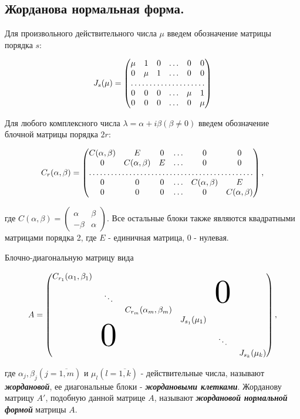 \subsection{
    Жорданова нормальная форма.
}

Для произвольного действительного числа $\mu$ введем обозначение матрицы порядка $s$:

$$J_s(\mu) = \begin{pmatrix} 
    \mu & 1 & 0 & \ldots & 0 & 0 \\
    0 & \mu & 1 & \ldots & 0 & 0 \\
    \hdotsfor6 \\
    0 & 0 & 0 & \ldots & \mu & 1 \\
    0 & 0 & 0 & \ldots & 0 & \mu
\end{pmatrix}$$

Для любого комплексного числа $\lambda = \alpha + i\beta (\beta \ne 0)$ введем обозначение блочной матрицы порядка $2r$:

$$C_r(\alpha, \beta) = \begin{pmatrix} 
    C(\alpha, \beta) & E & 0 & \ldots & 0 & 0 \\
    0 & C(\alpha, \beta) & E & \ldots & 0 & 0 \\
    \hdotsfor6 \\
    0 & 0 & 0 & \ldots & C(\alpha, \beta) & E \\
    0 & 0 & 0 & \ldots & 0 & C(\alpha, \beta)
\end{pmatrix},$$

где $C(\alpha, \beta) = \begin{pmatrix} 
    \alpha & \beta \\
    -\beta & \alpha
\end{pmatrix}$. Все остальные блоки также являются квадратными матрицами порядка 2, где $E$ - единичная матрица, 0 - нулевая.

Блочно-диагональную матрицу вида

\[
A = \begin{pmatrix}
    C_{r_1}(\alpha_1, \beta_1) &        &        &        &  \\
                               & \ddots &        &        & \scaleobj{4}{0}   \\
                               &        & C_{r_m}(\alpha_m, \beta_m) &        &   \\
                               &        &        & J_{s_1}(\mu_1) &   \\
                               & \scaleobj{4}{0} &        &     & \ddots  &  \\
                               &        &        &        & &J_{s_k}(\mu_k)
\end{pmatrix},
\]

где $\alpha_j, \beta_j (j = \overline{1, m})$ и $\mu_l (l = \overline{1, k})$ - действительные числа, называют \textbf{\textit{жордановой}}, ее диагональные блоки - \textbf{\textit{жордановыми клетками}}. Жорданову матрицу $A'$, подобную данной матрице $A$, называют \textbf{\textit{жордановой нормальной формой}} матрицы $A$.
